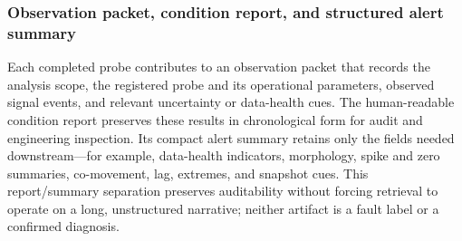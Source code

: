 \subsubsection{Observation packet, condition report, and structured alert summary}
Each completed probe contributes to an observation packet that records the analysis scope, the registered probe and its operational parameters, observed signal events, and relevant uncertainty or data-health cues. The human-readable condition report preserves these results in chronological form for audit and engineering inspection. Its compact alert summary retains only the fields needed downstream---for example, data-health indicators, morphology, spike and zero summaries, co-movement, lag, extremes, and snapshot cues. This report/summary separation preserves auditability without forcing retrieval to operate on a long, unstructured narrative; neither artifact is a fault label or a confirmed diagnosis.
